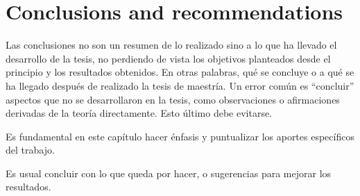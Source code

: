 \chapter{Conclusions and recommendations}

Las conclusiones no son un resumen de lo realizado sino a lo que ha llevado el
desarrollo de la tesis, no perdiendo de vista los objetivos planteados desde
el principio y los resultados obtenidos.  En otras palabras, qué se concluye o
a qué se ha llegado después de realizado la tesis de maestría.  Un error
común es ``concluir'' aspectos que no se desarrollaron en la tesis, como
observaciones o afirmaciones derivadas de la teoría directamente.  Esto último
debe evitarse.

Es fundamental en este capítulo hacer énfasis y puntualizar los
aportes específicos del trabajo.

Es usual concluir con lo que queda por hacer, o sugerencias para mejorar los
resultados.

